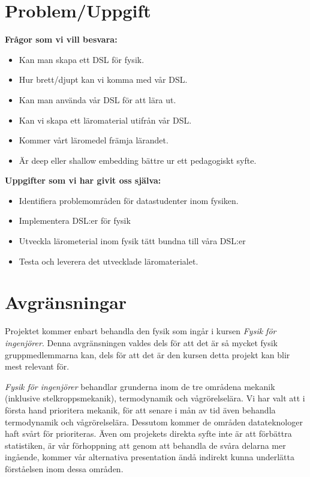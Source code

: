 \documentclass[12pt,a4paper]{article}
\begin{document}
\section{Problem/Uppgift}

\textbf{Frågor som vi vill besvara:}

\begin{itemize}
    \item Kan man skapa ett DSL för fysik.
    \item Hur brett/djupt kan vi komma med vår DSL.
    \item Kan man använda vår DSL för att lära ut.
    \item Kan vi skapa ett läromaterial utifrån vår DSL.
    \item Kommer vårt läromedel främja lärandet.
    \item Är deep eller shallow embedding bättre ur ett pedagogiskt syfte.
\end{itemize}

\textbf{Uppgifter som vi har givit oss själva:}

\begin{itemize}
    \item Identifiera problemområden för datastudenter inom fysiken.
    \item Implementera DSL:er för fysik
    \item Utveckla lärometerial inom fysik tätt bundna till våra DSL:er
    \item Testa och leverera det utvecklade läromaterialet.
\end{itemize}

\section{Avgränsningar}

Projektet kommer enbart behandla den fysik som ingår i kursen \textit{Fysik för ingenjörer}. Denna avgränsningen valdes dels för att det är så mycket fysik gruppmedlemmarna kan, dels för att det är den kursen detta projekt kan blir mest relevant för.

\textit{Fysik för ingenjörer} behandlar grunderna inom de tre områdena mekanik (inklusive stelkroppsmekanik), termodynamik och vågrörelselära. Vi har valt att i första hand prioritera mekanik, för att senare i mån av tid även behandla termodynamik och vågrörelselära. Dessutom kommer de områden datateknologer haft svårt för prioriteras. Även om projekets direkta syfte inte är att förbättra statistiken, är vår förhoppning att genom att behandla de svåra delarna mer ingående, kommer vår alternativa presentation ändå indirekt kunna underlätta förståelsen inom dessa områden.
\end{document}
